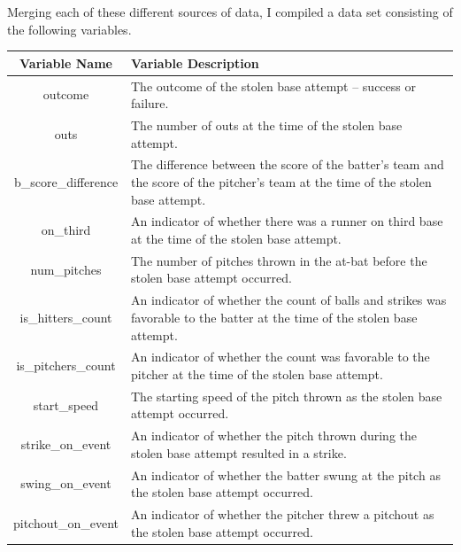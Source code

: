 \documentclass{article}
\begin{document}
Merging each of these different sources of data, I compiled a data set consisting of the following variables.
\begin{center}
    \begin{longtable}{c p{12cm}}
         \hline
         \textbf{Variable Name} & \textbf{Variable Description} \\ [0.5ex]
         \hline
         outcome & The outcome of the stolen base attempt -- success or failure. \\
         
         outs & The number of outs at the time of the stolen base attempt. \\
         
         b\_score\_difference & The difference between the score of the batter's team and the score of the pitcher's team at the time of the stolen base attempt. \\
         
         on\_third & An indicator of whether there was a runner on third base at the time of the stolen base attempt. \\
         
         num\_pitches & The number of pitches thrown in the at-bat before the stolen base attempt occurred. \\
         
         is\_hitters\_count & An indicator of whether the count of balls and strikes was favorable to the batter at the time of the stolen base attempt. \\
         
         is\_pitchers\_count & An indicator of whether the count was favorable to the pitcher at the time of the stolen base attempt. \\
         
         start\_speed & The starting speed of the pitch thrown as the stolen base attempt occurred. \\
         
         strike\_on\_event & An indicator of whether the pitch thrown during the stolen base attempt resulted in a strike. \\
         
         swing\_on\_event & An indicator of whether the batter swung at the pitch as the stolen base attempt occurred. \\
         
         pitchout\_on\_event & An indicator of whether the pitcher threw a pitchout as the stolen base attempt occurred. \\
         

\end{longtable}
\end{center}
\end{document}
